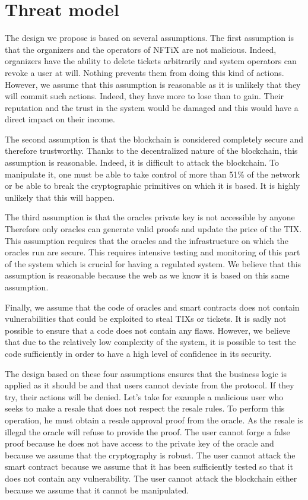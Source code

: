 \documentclass[a4paper,11pt,oneside]{report}
\begin{document}
\section{Threat model}
The design we propose is based on several assumptions. The first assumption is that the organizers and the operators of NFTiX are not malicious. Indeed, organizers have the ability to delete tickets arbitrarily and system operators can revoke a user at will. Nothing prevents them from doing this kind of actions. However, we assume that this assumption is reasonable as it is unlikely that they will commit such actions. Indeed, they have more to lose than to gain. Their reputation and the trust in the system would be damaged and this would have a direct impact on their income.

The second assumption is that the blockchain is considered completely secure and therefore trustworthy. Thanks to the decentralized nature of the blockchain, this assumption is reasonable. Indeed, it is difficult to attack the blockchain. To manipulate it, one must be able to take control of more than 51\% of the network or be able to break the cryptographic primitives on which it is based. It is highly unlikely that this will happen.

The third assumption is that the oracles private key is not accessible by anyone Therefore only oracles can generate valid proofs and update the price of the TIX. This assumption requires that the oracles and the infrastructure on which the oracles run are secure. This requires intensive testing and monitoring of this part of the system which is crucial for having a regulated system. We believe that this assumption is reasonable because the web as we know it is based on this same assumption.

Finally, we assume that the code of oracles and smart contracts does not contain vulnerabilities that could be exploited to steal TIXs or tickets. It is sadly not possible to ensure that a code does not contain any flaws. However, we believe that due to the relatively low complexity of the system, it is possible to test the code sufficiently in order to have a high level of confidence in its security.

The design based on these four assumptions ensures that the business logic is applied as it should be and that users cannot deviate from the protocol. If they try, their actions will be denied. Let's take for example a malicious user who seeks to make a resale that does not respect the resale rules. To perform this operation, he must obtain a resale approval proof from the oracle. As the resale is illegal the oracle will refuse to provide the proof. The user cannot forge a false proof because he does not have access to the private key of the oracle and because we assume that the cryptography is robust. The user cannot attack the smart contract because we assume that it has been sufficiently tested so that it does not contain any vulnerability. The user cannot attack the blockchain either because we assume that it cannot be manipulated.
\end{document}
